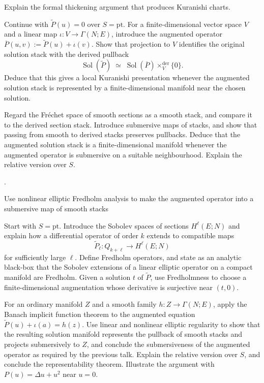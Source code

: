 \documentclass[11pt,a4paper]{book}
\begin{document}
{Explain the formal thickening argument that produces Kuranishi charts.}
{Continue with $\widetilde{P}(u) = 0$ over $S = \mathrm{pt}$. For a finite-dimensional vector space \(V\) and a linear map \(\iota\colon V\to\Gamma(N;E)\), introduce the augmented operator $\overline{P}(u,v) := \widetilde{P}(u) + \iota(v)$. Show that projection to \(V\) identifies the original solution stack with the derived pullback
	\[
	\operatorname{Sol}(\widetilde P) \; \simeq \; \operatorname{Sol}(\overline P)\times_V^{\mathrm{der}}\{0\}.
	\]
	Deduce that this gives a local Kuranishi presentation whenever the augmented solution stack is represented by a finite-dimensional manifold near the chosen solution.
	
	Regard the Fr\'echet space of smooth sections as a smooth stack, and compare it to the derived section stack. Introduce submersive maps of stacks, and show that passing from smooth to derived stacks preserves pullbacks. Deduce that the augmented solution stack is a finite-dimensional manifold whenever the augmented operator is submersive on a suitable neighbourhood. Explain the relative version over $S$.}
{\textcite[Propositions~2.2.17--2.2.18 and Corollary~2.2.19;
	Propositions~3.1.7 and~3.1.9 and Lemma~3.2.11;
	the final pullback argument following the proof of claim~$(*)$ in Theorem~3.4.3;
	Proposition~2.1.48 and Corollary~2.1.49]{Steffens_Representability_Elliptic_Moduli}.}

{Use nonlinear elliptic Fredholm analysis to make the augmented operator into a submersive map of smooth stacks}
{Start with $S = \mathrm{pt}$. Introduce the Sobolev spaces of sections $H^{\ell}(E;N)$ and explain how a differential operator of order $k$ extends to compatible maps
	\[
	\widetilde{P}_\ell\colon Q_{k+\ell}\longrightarrow H^\ell(E;N)
	\]
	for sufficiently large $\ell$. Define Fredholm operators, and state as an analytic black-box that the Sobolev extensions of a linear elliptic operator on a compact manifold are Fredholm. Given a solution $t$ of $\widetilde P$, use Fredholmness to choose a finite-dimensional augmentation whose derivative is surjective near $(t,0)$.
	
	For an ordinary manifold $Z$ and a smooth family $h\colon Z\to\Gamma(N;E)$, apply the Banach implicit function theorem to the augmented equation $\widetilde P(u)+\iota(a)=h(z)$. Use linear and nonlinear elliptic regularity to show that the resulting solution manifold represents the pullback of smooth stacks and projects submersively to $Z$, and conclude the submersiveness of the augmented operator as required by the previous talk. Explain the relative version over $S$, and conclude the representability theorem. Illustrate the argument with $P(u)=\Delta u+u^2$ near $u=0$.}
{\textcite[Lemmas~3.4.5--3.4.6, the analytic part of the proof of
	Theorem~3.4.3]{Steffens_Representability_Elliptic_Moduli}}
\end{document}
